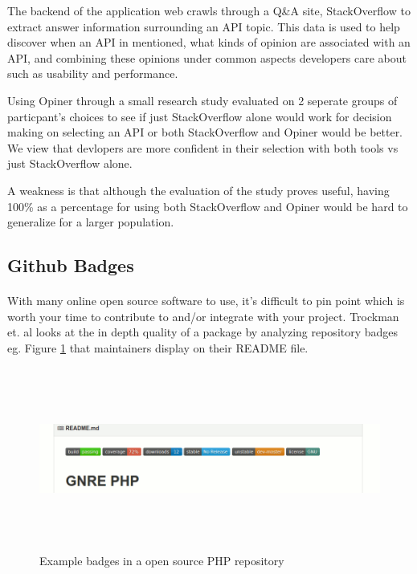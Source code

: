 \documentclass[12pt]{article}
\begin{document}
The backend of the application web crawls through a Q\&A site, StackOverflow \cite{stackoverflow} to extract answer
information surrounding an API topic. This data is used to help discover when an API in mentioned, what kinds of opinion
are associated with an API, and combining these opinions under common aspects developers care about such as usability and performance.

Using Opiner \cite{opiner} through a small research study evaluated on 2 seperate groups of particpant's choices to see if 
just StackOverflow \cite{stackoverflow} alone would work for decision making on selecting an API or both StackOverflow and Opiner would be better.
We view that devlopers are more confident in their selection with both tools vs just StackOverflow alone. 

A weakness is that although the evaluation of the study proves useful, having 100\% as a percentage for using both StackOverflow and Opiner
would be hard to generalize for a larger population. 

\subsection{Github Badges}
\paragraph{}
With many online open source software to use, it's difficult to pin point which is worth your time to contribute to and/or integrate with your project.
Trockman et. al \cite{githubbadges} looks at the in depth quality of a package by analyzing repository badges eg. Figure \ref{phpbadge} that maintainers display on their README file.

\begin{figure}
    \centering
    \includegraphics[width=\textwidth,height=6cm,keepaspectratio=true]{gnrephpbadges}
    \caption{
        Example badges in a open source PHP repository \protect\cite{badgeimage}
    }
    \label{phpbadge}
\end{figure}
\end{document}
